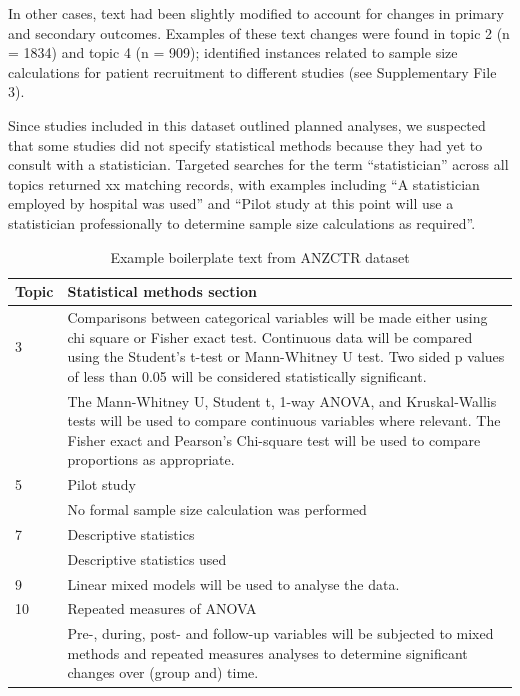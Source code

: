 \documentclass[12pt]{article}
\begin{document}
In other cases, text had been slightly modified to account for changes
in primary and secondary outcomes. Examples of these text changes were
found in topic 2 (n = 1834) and topic 4 (n = 909); identified instances
related to sample size calculations for patient recruitment to different
studies (see Supplementary File 3).

Since studies included in this dataset outlined planned analyses, we
suspected that some studies did not specify statistical methods because
they had yet to consult with a statistician. Targeted searches for the
term ``statistician'' across all topics returned xx matching records,
with examples including ``A statistician employed by hospital was used''
and ``Pilot study at this point will use a statistician professionally
to determine sample size calculations as required''.

\begin{landscape}
\begin{table}[]
\centering
\caption{Example boilerplate text from ANZCTR dataset}
\label{tab:anzctr-example-boilerplate}
\begin{tabular}{p{0.1\linewidth} p{0.9\linewidth}}
\hline
\textbf{Topic} & \textbf{Statistical methods section} \\ \hline
3 & Comparisons between categorical variables will be made either using chi square or Fisher exact test. Continuous data will be compared using the Student’s t-test or Mann-Whitney U test. Two sided p values of less than 0.05 will be considered statistically significant.\\
 &  The Mann-Whitney U, Student t, 1-way ANOVA, and Kruskal-Wallis tests will be used to compare continuous variables where relevant. The Fisher exact and Pearson’s Chi-square test will be used to compare proportions as appropriate. \\ \hline
5 & Pilot study \\
 &  No formal sample size calculation was performed \\ \hline
7 & Descriptive statistics \\
 &  Descriptive statistics used \\ \hline
9 & Linear mixed models will be used to analyse the data. \\ \hline
10 & Repeated measures of ANOVA \\
 &  Pre-, during, post- and follow-up variables will be subjected to mixed methods and repeated measures analyses to determine significant changes over (group and) time. \\ \hline
\end{tabular}
\end{table}
\end{landscape}
\end{document}
